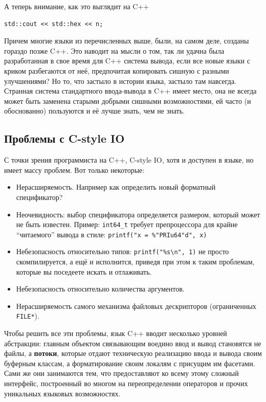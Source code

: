 \documentclass[a4paper,12pt,oneside]{book}
\begin{document}
А теперь внимание, как это выглядит на C++

\begin{lstlisting}
std::cout << std::hex << n;
\end{lstlisting}

Причем многие языки из перечисленных выше, были, на самом деле, созданы гораздо позже C++. Это наводит на мысли о том, так ли удачна была разработанная в свое время для C++ система вывода, если все новые языки с криком разбегаются от неё, предпочитая копировать сишную с разными улучшениями? Но то, что застыло в истории языка, застыло там навсегда. Странная система стандартного ввода-вывода в C++ имеет место, она не всегда может быть заменена старыми добрыми сишными возможностями, ей часто (и обоснованно) пользуются и её лучше знать, чем не знать.

\subsection{Проблемы с C-style IO}

С точки зрения программиста на C++, C-style IO, хотя и доступен в языке, но имеет массу проблем. Вот только некоторые:

\begin{itemize}
\item Нерасширяемость. Например как определить новый форматный спецификатор?
\item Неочевидность: выбор спецификатора определяется размером, который может не быть известен. Пример: \lstinline!int64_t! требует препроцессора для крайне ``читаемого'' вывода в стиле: \lstinline!printf("x = %"PRIu64"d", x)!
\item Небезопасность относительно типов: \lstinline!printf("%s\n", 1)! не просто скомпилируется, а ещё и исполнится, приведя при этом к таким проблемам, которые вы поседеете искать и отлаживать.
\item Небезопасность относительно количества аргументов.
\item Нерасширяемость самого механизма файловых дескрипторов (ограниченных \lstinline!FILE*!).
\end{itemize}

Чтобы решить все эти проблемы, язык C++ вводит несколько уровней абстракции: главным объектом связывающим воедино ввод и вывод становятся не файлы, а \textbf{потоки}, которые отдают техническую реализацию ввода и вывода своим буферным классам, а форматирование своим локалям с присущим им фасетами. Сами же они занимаются тем, что предоставляют ко всему этому сложный интерфейс, построенный во многом на переопределении операторов и прочих уникальных языковых возможностях.
\end{document}
